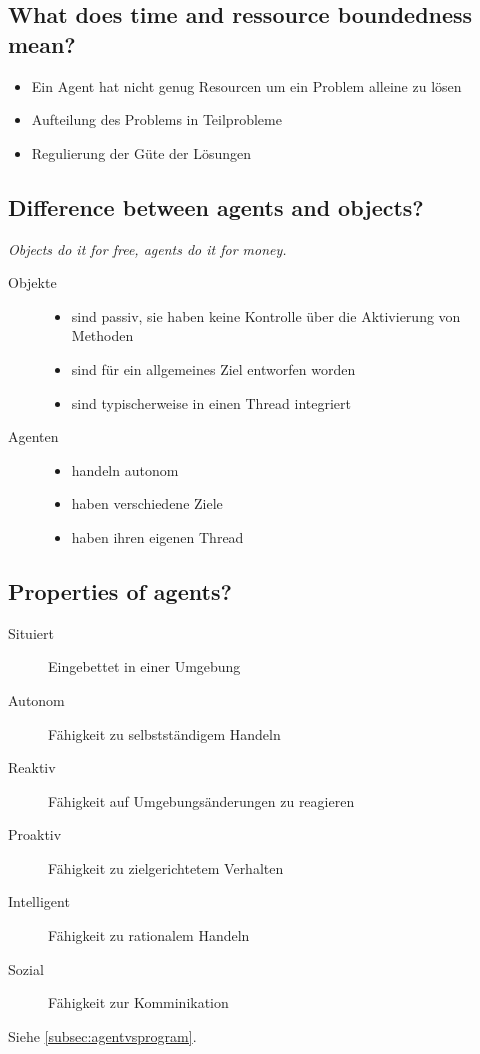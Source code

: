 \subsection{What does time and ressource boundedness mean?}
\begin{itemize}
	\item Ein Agent hat nicht genug Resourcen um ein Problem alleine zu lösen
	\item Aufteilung des Problems in Teilprobleme
	\item Regulierung der Güte der Lösungen
\end{itemize}
\subsection{Difference between agents and objects?}
\emph{Objects do it for free, agents do it for money.}
\begin{description}
	\item [Objekte] \begin{itemize}
		\item sind passiv, sie haben keine Kontrolle über die Aktivierung von Methoden
		\item sind für ein allgemeines Ziel entworfen worden
		\item sind typischerweise in einen Thread integriert
	\end{itemize}
	\item [Agenten] \begin{itemize}
		\item handeln autonom
		\item haben verschiedene Ziele
		\item haben ihren eigenen Thread
	\end{itemize}
\end{description}
\subsection{Properties of agents?}
\begin{description}
		\item[Situiert] Eingebettet in einer Umgebung
		\item[Autonom] Fähigkeit zu selbstständigem Handeln
		\item[Reaktiv] Fähigkeit auf Umgebungsänderungen zu reagieren
		\item[Proaktiv] Fähigkeit zu zielgerichtetem Verhalten
		\item[Intelligent] Fähigkeit zu rationalem Handeln
		\item[Sozial] Fähigkeit zur Komminikation
	\end{description}
Siehe \ref{subsec:agentvsprogram}.